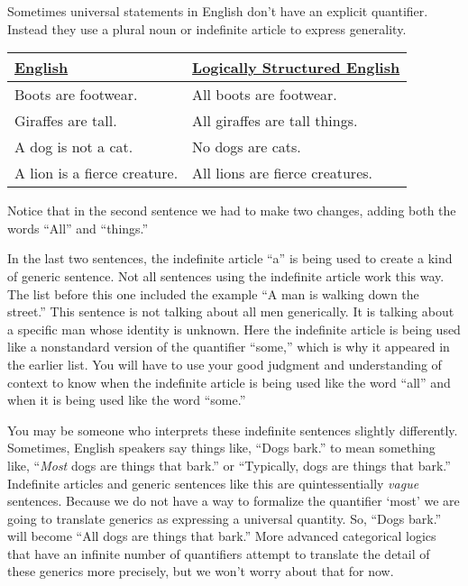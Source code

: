 Sometimes universal statements in English don't have an explicit quantifier. Instead they use a plural noun or indefinite article to express generality.

\begin{table}
\begin{longtabu}{p{.5\linewidth}p{.5\linewidth}}
\underline{English} &
\underline{Logically Structured English} \\
\endhead
Boots are footwear. & All boots are footwear.\\
Giraffes are tall. & All giraffes are tall things.\\
A dog is not a cat. & No dogs are cats.\\

A lion is a fierce creature. &
All lions are fierce creatures.\\

\end{longtabu}
\end{table}

\noindent Notice that in the second sentence we had to make two changes, adding both the words ``All'' and ``things.''

In the last two sentences, the indefinite article ``a'' is being used to create a kind of generic sentence. Not all sentences using the indefinite article work this way. The list before this one included the example ``A man is walking down the street.'' This sentence is not talking about all men generically. It is talking about a specific man whose identity is unknown. Here the indefinite article is being used like a nonstandard version of the quantifier ``some,'' which is why it appeared in the earlier list. You will have to use your good judgment and understanding of context to know when the indefinite article is being used like the word ``all'' and when it is being used like the word ``some.''

You may be someone who interprets these indefinite sentences slightly differently. Sometimes, English speakers say things like, ``Dogs bark.'' to mean something like, ``\emph{Most} dogs are things that bark.'' or ``Typically, dogs are things that bark.'' Indefinite articles and generic sentences like this are quintessentially \emph{vague} sentences. Because we do not have a way to formalize the quantifier `most' we are going to translate generics as expressing a universal quantity. So, ``Dogs bark.'' will become ``All dogs are things that bark.'' More advanced categorical logics that have an infinite number of quantifiers attempt to translate the detail of these generics more precisely, but we won't worry about that for now.

